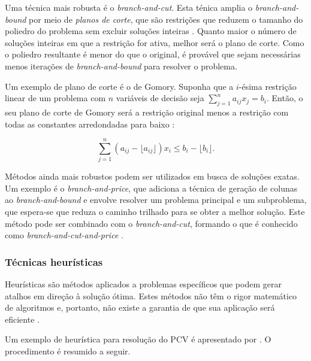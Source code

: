 Uma técnica mais robusta é o \emph{branch-and-cut}. Esta ténica amplia o \emph{branch-and-bound} por meio de \emph{planos de corte}, que são restrições que reduzem o tamanho do poliedro do problema sem excluir soluções inteiras \cite{CARRANO:19}. Quanto maior o número de soluções inteiras em que a restrição for ativa, melhor será o plano de corte. Como o poliedro resultante é menor do que o original, é provável que sejam necessárias menos iterações de \emph{branch-and-bound} para resolver o problema.

Um exemplo de plano de corte é o de Gomory. Suponha que a $i$-ésima restrição linear de um problema com $n$ variáveis de decisão seja $\sum_{j = 1}^{n}a_{ij}x_{j} = b_i$. Então, o seu plano de corte de Gomory será a restrição original menos a restrição com todas as constantes arredondadas para baixo \cite{LEUNG:12,RAVELO:20}:

\begin{equation}
    \sum_{j = 1}^{n}(a_{ij} - \lfloor a_{ij} \rfloor) x_{i} \leq b_i - \lfloor b_i \rfloor.
\end{equation}

Métodos ainda mais robustos podem ser utilizados em busca de soluções exatas. Um exemplo é o \emph{branch-and-price}, que adiciona a técnica de geração de colunas ao \emph{branch-and-bound} e envolve resolver um problema principal e um subproblema, que espera-se que reduza o caminho trilhado para se obter a melhor solução. Este método pode ser combinado com o \emph{branch-and-cut}, formando o que é conhecido como \emph{branch-and-cut-and-price} \cite{CHALAWSKY:22,VIEIRA:13}.

\subsubsection{Técnicas heurísticas}\label{sec:técnicas heurísticas}
Heurísticas são métodos aplicados a problemas específicos que podem gerar atalhos em direção à solução ótima. Estes métodos não têm o rigor matemático de algoritmos e, portanto, não existe a garantia de que sua aplicação será eficiente \cite{BUTTERFIELD:16,VIEIRA:13}.

Um exemplo de heurística para resolução do PCV é apresentado por \textcite{SCHERMER:23}. O procedimento é resumido a seguir.


